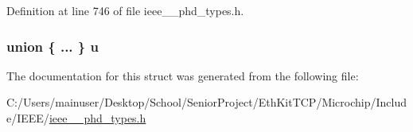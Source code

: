 Definition at line 746 of file ieee\+\_\+\_\+phd\+\_\+types.\+h.

\hypertarget{struct___a_p_d_u_a0b9e6d2a2283ef4bef6650ac5e6b0907}{}
\subsubsection[{u}]{\setlength{\rightskip}{0pt plus 5cm}union \{ ... \}   u}\label{struct___a_p_d_u_a0b9e6d2a2283ef4bef6650ac5e6b0907}


The documentation for this struct was generated from the following file\+:\begin{DoxyCompactItemize}
\item 
C\+:/\+Users/mainuser/\+Desktop/\+School/\+Senior\+Project/\+Eth\+Kit\+T\+C\+P/\+Microchip/\+Include/\+I\+E\+E\+E/\hyperlink{ieee__11073__phd__types_8h}{ieee\+\_\+\_\+phd\+\_\+types.\+h}\end{DoxyCompactItemize}
